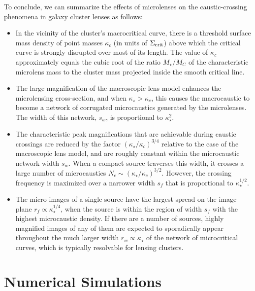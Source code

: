 \documentclass{aastex6}
\begin{document}
To conclude, we can summarize the effects of microlenses on the caustic-crossing phenomena in galaxy cluster lenses as follows:
\begin{itemize}

\item In the vicinity of the cluster's macrocritical curve, there is a threshold surface mass density of point masses $\kappa_c$ (in units of $\Sigma_{\rm crit}$) above which the critical curve is strongly disrupted over most of its length. The value of $\kappa_c$ approximately equals the cubic root of the ratio $M_\star/M_C$ of the characteristic microlens mass to the cluster mass projected inside the smooth critical line.

\item The large magnification of the macroscopic lens model enhances the microlensing cross-section, and when $\kappa_\star > \kappa_c$, this causes the macrocaustic to become a network of corrugated microcaustics generated by the microlenses. The width of this network, $s_w$, is proportional to $\kappa_\star^2$. 

\item The characteristic peak magnifications that are achievable during caustic crossings are reduced by the factor $(\kappa_\star/\kappa_c)^{3/4}$ relative to the case of the macroscopic lens model, and are roughly constant within the microcaustic network width $s_w$. When a compact source traverses this width, it crosses a large number of microcaustics $N_c \sim (\kappa_\star/\kappa_c)^{3/2}$. However, the crossing frequency is maximized over a narrower width $s_f$ that is proportional to $\kappa_\star^{1/2}$.

\item The micro-images of a single source have the largest spread on the image plane $r_f \propto \kappa_\star^{1/4}$, when the source is within the region of width $s_f$ with the highest microcaustic density. If there are a number of sources, highly magnified images of any of them are expected to sporadically appear throughout the much larger width $r_w \propto \kappa_\star$ of the network of microcritical curves, which is typically resolvable for lensing clusters.

\end{itemize}

\section{Numerical Simulations}
\label{sec:numerical}
\end{document}
